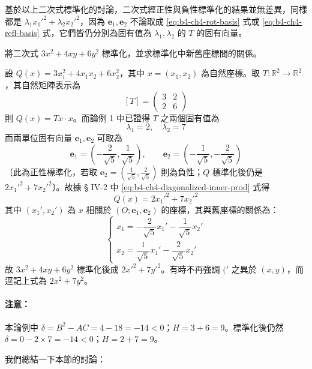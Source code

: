 基於以上二次式標準化的討論，二次式經正性與負性標準化的結果並無差異，同樣都是 $\lambda_1 {x_1'}^2 + \lambda_2 {x_2'}^2$，因為 $\mathbf{e}_1, \mathbf{e}_2$ 不論取成 \eqref{eq:b4-ch4-rot-basis} 式或 \eqref{eq:b4-ch4-refl-basis} 式，它們皆仍分別為固有值為 $\lambda_1, \lambda_2$ 的 $T$ 的固有向量。

\begin{discussion}
將二次式 $3x^2 + 4xy + 6y^2$ 標準化，並求標準化中新舊座標間的關係。
\end{discussion}

\begin{solution}
設 $Q(x) = 3x_1^2 + 4x_1 x_2 + 6x_2^2$，其中 $x = (x_1, x_2)$ 為自然座標。取 $T: \mathbb{R}^2 \to \mathbb{R}^2$，其自然矩陣表示為
\[
[T] = \begin{pmatrix} 3 & 2 \\ 2 & 6 \end{pmatrix}
\]
則 $Q(x) = Tx \cdot x$。而論例 1 中已證得 $T$ 之兩個固有值為
\[
\lambda_1 = 2, \quad \lambda_2 = 7
\]
而兩單位固有向量 $\mathbf{e}_1, \mathbf{e}_2$ 可取為
\[
\mathbf{e}_1 = \left( -\frac{2}{\sqrt{5}}, \frac{1}{\sqrt{5}} \right), \qquad
\mathbf{e}_2 = \left( -\frac{1}{\sqrt{5}}, -\frac{2}{\sqrt{5}} \right)
\]
〔此為正性標準化，若取 $\mathbf{e}_2 = \left( \frac{1}{\sqrt{5}}, \frac{2}{\sqrt{5}} \right)$ 則為負性；$Q$ 標準化後仍是 $2{x_1'}^2 + 7{x_2'}^2$〕。故據 § IV-2 中 \eqref{eq:b4-ch4-diagonalized-inner-prod} 式得
\[
Q(x) = 2{x_1'}^2 + 7{x_2'}^2
\]
其中 $(x_1', x_2')$ 為 $x$ 相關於 $(O; \mathbf{e}_1, \mathbf{e}_2)$ 的座標，其與舊座標的關係為：
\[
\begin{cases}
x_1 = -\dfrac{2}{\sqrt{5}}x_1' - \dfrac{1}{\sqrt{5}}x_2' \\[0.5em]
x_2 = \dfrac{1}{\sqrt{5}}x_1' - \dfrac{2}{\sqrt{5}}x_2'
\end{cases}
\]
故 $3x^2 + 4xy + 6y^2$ 標準化後成 $2{x'}^2 + 7{y'}^2$。有時不再強調 $('$ 之異於 $(x, y)$，而逕記上式為 $2x^2 + 7y^2$。
\end{solution}

\paragraph{注意：}
本論例中 $\delta = B^2 - AC = 4 - 18 = -14 < 0$；$H = 3 + 6 = 9$。標準化後仍然 $\delta = 0 - 2 \times 7 = -14 < 0$；$H = 2 + 7 = 9$。

我們總結一下本節的討論：


